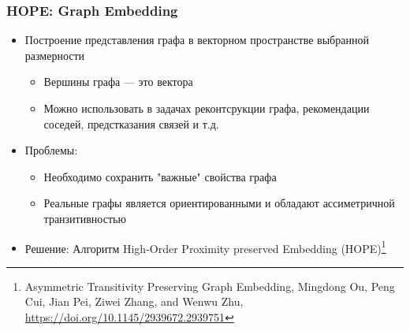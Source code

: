 \documentclass[xcolor=table,english]{beamer}
\begin{document}
\begin{frame}[fragile] \frametitle{HOPE: Graph Embedding}
    \begin{itemize}
        \item Построение представления графа в векторном пространстве выбранной размерности
        {
            \begin{itemize}
                \item Вершины графа --- это вектора
                \item Можно использовать в задачах реконтсрукции графа, рекомендации соседей, предстказания связей и т.д.
            \end{itemize} 
        }
        \item Проблемы:
        {
            \begin{itemize}
                \item Необходимо сохранить "важные" свойства графа
                \item Реальные графы является ориентированными и обладают ассиметричной транзитивностью
            \end{itemize}
        }
        \item Решение: Алгоритм High-Order Proximity preserved Embedding (HOPE)\footnote{Asymmetric Transitivity Preserving Graph Embedding, Mingdong Ou, Peng Cui, Jian Pei, Ziwei Zhang, and Wenwu Zhu, \href{https://doi.org/10.1145/2939672.2939751}{https://doi.org/10.1145/2939672.2939751}}
    \end{itemize}
\end{frame}
\end{document}
